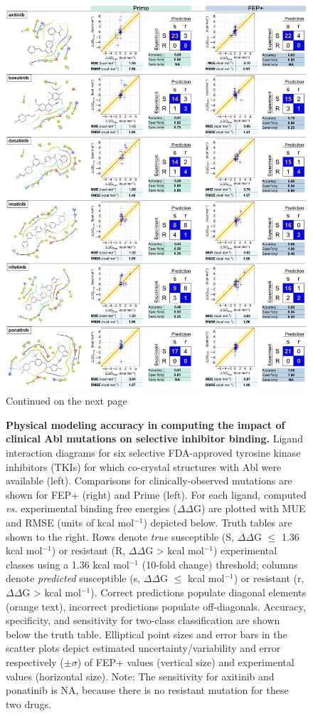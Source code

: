 \documentclass[phd,tocprelim]{cornell}
\begin{document}
\begin{landscape}
	\begin{figure}[p]
		\centering
		\includegraphics[width=0.5\linewidth]{figures/abl-figure-4.pdf}
		\caption[Physical modeling accuracy in computing the impact of clinical Abl mutations on selective inhibitor binding.]{
			Continued on the next page
			}
		\label{fig:abl-figure4}
	\end{figure}
\end{landscape}
\addtocounter{figure}{-1}
\begin{landscape}
	\begin{figure}
		\caption[Figure caption]{{\bf Physical modeling accuracy in computing the impact of clinical Abl mutations on selective inhibitor binding.}
			Ligand interaction diagrams for six selective FDA-approved tyrosine kinase inhibitors (TKIs) for which co-crystal structures with Abl were available (left). Comparisons for clinically-observed mutations are shown for FEP+ (right) and Prime (left).
			For each ligand, computed \emph{vs.} experimental binding free energies ($\Delta \Delta$G) are plotted with MUE and RMSE (units of kcal mol$^{-1}$) depicted below.
			Truth tables are shown to the right.
			Rows denote \emph{true} susceptible (S, $\Delta \Delta$G $\leq$ 1.36 kcal mol$^{-1}$) or resistant (R, $\Delta \Delta$G > kcal mol$^{-1}$) experimental classes using a 1.36 kcal mol$^{-1}$ (10-fold change) threshold;
			columns denote \emph{predicted} susceptible (s, $\Delta \Delta$G $\leq$ kcal mol$^{-1}$) or resistant (r, $\Delta \Delta$G > kcal mol$^{-1}$).
			Correct predictions populate diagonal elements (orange text), incorrect predictions populate off-diagonals.
			Accuracy, specificity, and sensitivity for two-class classification are shown below the truth table.
			Elliptical point sizes and error bars in the scatter plots depict estimated uncertainty/variability and error respectively ($\pm\sigma$) of FEP+ values (vertical size) and experimental values (horizontal size).
			Note: The sensitivity for axitinib and ponatinib is NA, because there is no resistant mutation for these two drugs.
		}
	\end{figure}
\end{landscape}
\end{document}
